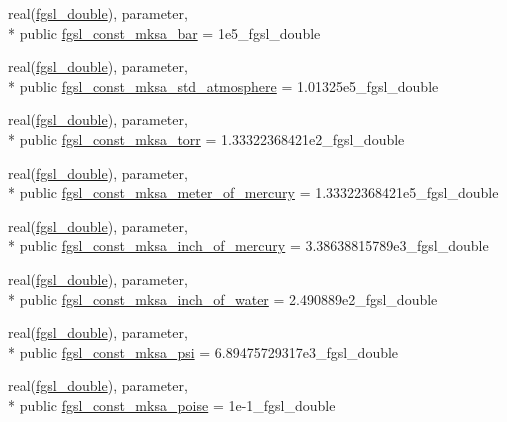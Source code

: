 \begin{DoxyCompactItemize}
\item 
real(\hyperlink{classfgsl_a9af5113378e0f000eb479d3f90196ddf}{fgsl\-\_\-double}), parameter, \\*
public \hyperlink{classfgsl_a218481ee71a34d944cbc21affd61bc8a}{fgsl\-\_\-const\-\_\-mksa\-\_\-bar} = 1e5\-\_\-fgsl\-\_\-double
\item 
real(\hyperlink{classfgsl_a9af5113378e0f000eb479d3f90196ddf}{fgsl\-\_\-double}), parameter, \\*
public \hyperlink{classfgsl_ae2440545adbbcd420b11d8e12db0a681}{fgsl\-\_\-const\-\_\-mksa\-\_\-std\-\_\-atmosphere} = 1.\-01325e5\-\_\-fgsl\-\_\-double
\item 
real(\hyperlink{classfgsl_a9af5113378e0f000eb479d3f90196ddf}{fgsl\-\_\-double}), parameter, \\*
public \hyperlink{classfgsl_aba0c7c1da846e36ceea84cec02bb6478}{fgsl\-\_\-const\-\_\-mksa\-\_\-torr} = 1.\-33322368421e2\-\_\-fgsl\-\_\-double
\item 
real(\hyperlink{classfgsl_a9af5113378e0f000eb479d3f90196ddf}{fgsl\-\_\-double}), parameter, \\*
public \hyperlink{classfgsl_a7f5943b971d1e27da66ed35eb36865a0}{fgsl\-\_\-const\-\_\-mksa\-\_\-meter\-\_\-of\-\_\-mercury} = 1.\-33322368421e5\-\_\-fgsl\-\_\-double
\item 
real(\hyperlink{classfgsl_a9af5113378e0f000eb479d3f90196ddf}{fgsl\-\_\-double}), parameter, \\*
public \hyperlink{classfgsl_a66f697c831591659ce7e9305e7c18c46}{fgsl\-\_\-const\-\_\-mksa\-\_\-inch\-\_\-of\-\_\-mercury} = 3.\-38638815789e3\-\_\-fgsl\-\_\-double
\item 
real(\hyperlink{classfgsl_a9af5113378e0f000eb479d3f90196ddf}{fgsl\-\_\-double}), parameter, \\*
public \hyperlink{classfgsl_afdebd41de62af9d5a4b9ed6efcf9cea2}{fgsl\-\_\-const\-\_\-mksa\-\_\-inch\-\_\-of\-\_\-water} = 2.\-490889e2\-\_\-fgsl\-\_\-double
\item 
real(\hyperlink{classfgsl_a9af5113378e0f000eb479d3f90196ddf}{fgsl\-\_\-double}), parameter, \\*
public \hyperlink{classfgsl_af1bb05c944f3cc7eca8c2ffb562c1cfe}{fgsl\-\_\-const\-\_\-mksa\-\_\-psi} = 6.\-89475729317e3\-\_\-fgsl\-\_\-double
\item 
real(\hyperlink{classfgsl_a9af5113378e0f000eb479d3f90196ddf}{fgsl\-\_\-double}), parameter, \\*
public \hyperlink{classfgsl_a1b18b9e73da6e94185746f50a31ca4c3}{fgsl\-\_\-const\-\_\-mksa\-\_\-poise} = 1e-\/1\-\_\-fgsl\-\_\-double

\end{DoxyCompactItemize}
